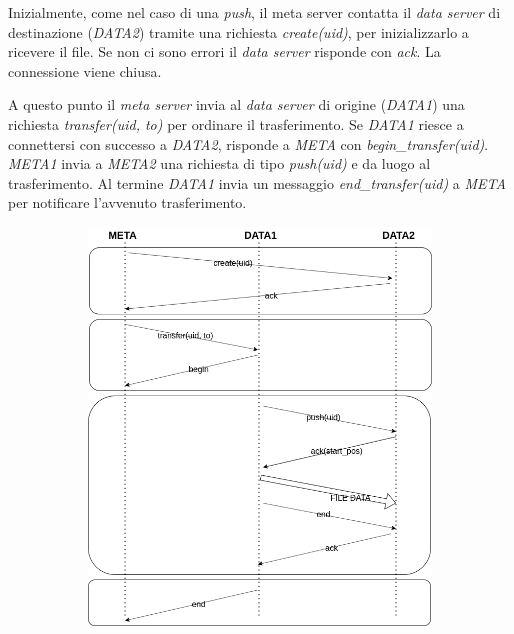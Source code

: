 \documentclass{article}
\begin{document}
Inizialmente, come nel caso di una \textit{push}, il meta server contatta il \textit{data server} di destinazione (\textit{DATA2}) tramite una richiesta \textit{create(uid)}, per inizializzarlo a ricevere il file. Se non ci sono errori il \textit{data server} risponde con \textit{ack}. La connessione viene chiusa. 

A questo punto il \textit{meta server} invia al \textit{data server} di origine (\textit{DATA1}) una richiesta \textit{transfer(uid, to)} per ordinare il trasferimento. Se \textit{DATA1} riesce a connettersi con successo a \textit{DATA2}, risponde a \textit{META} con \textit{begin\_transfer(uid)}. \textit{META1} invia a \textit{META2} una richiesta di tipo \textit{push(uid)} e da luogo al trasferimento. Al termine \textit{DATA1} invia un messaggio \textit{end\_transfer(uid)} a \textit{META} per notificare l'avvenuto trasferimento.


\begin{figure}[H]
	\centering
	\begin{subfigure}{0.80\linewidth}
		\includegraphics[width=\linewidth]{../diagrams/requests/transfer_request.png}
	\end{subfigure}
\end{figure}
\end{document}
